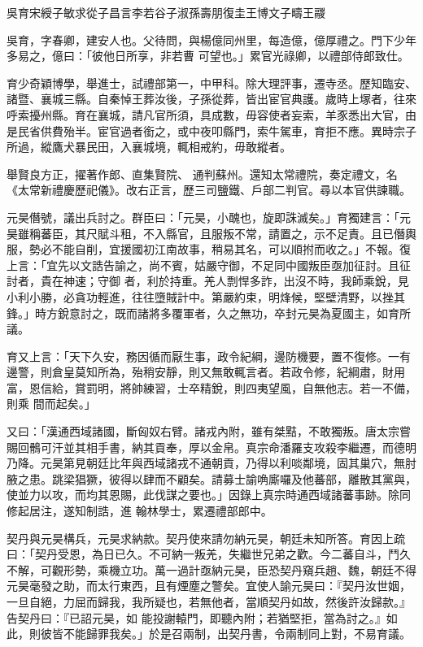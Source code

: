 
\begin{pinyinscope}

 吳育宋綬子敏求從子昌言李若谷子淑孫壽朋復圭王博文子疇王鬷



 吳育，字春卿，建安人也。父待問，與楊億同州里，每造億，億厚禮之。門下少年多易之，億曰：「彼他日所享，非若曹
 可望也。」累官光祿卿，以禮部侍郎致仕。



 育少奇穎博學，舉進士，試禮部第一，中甲科。除大理評事，遷寺丞。歷知臨安、諸暨、襄城三縣。自秦悼王葬汝後，子孫從葬，皆出宦官典護。歲時上塚者，往來呼索擾州縣。育在襄城，請凡官所須，具成數，毋容使者妄索，羊豕悉出大官，由是民省供費殆半。宦官過者銜之，或中夜叩縣門，索牛駕車，育拒不應。異時宗子所過，縱鷹犬暴民田，入襄城境，輒相戒約，毋敢縱者。



 舉賢良方正，擢著作郎、直集賢院、
 通判蘇州。還知太常禮院，奏定禮文，名《太常新禮慶歷祀儀》。改右正言，歷三司鹽鐵、戶部二判官。尋以本官供諫職。



 元昊僭號，議出兵討之。群臣曰：「元昊，小醜也，旋即誅滅矣。」育獨建言：「元昊雖稱蕃臣，其尺賦斗租，不入縣官，且服叛不常，請置之，示不足責。且已僭輿服，勢必不能自削，宜援國初江南故事，稍易其名，可以順拊而收之。」不報。復上言：「宜先以文誥告諭之，尚不賓，姑嚴守御，不足同中國叛臣亟加征討。且征討者，貴在神速；守御
 者，利於持重。羌人剽悍多詐，出沒不時，我師乘銳，見小利小勝，必貪功輕進，往往墮賊計中。第嚴約束，明烽候，堅壁清野，以挫其鋒。」時方銳意討之，既而諸將多覆軍者，久之無功，卒封元昊為夏國主，如育所議。



 育又上言：「天下久安，務因循而厭生事，政令紀綱，邊防機要，置不復修。一有邊警，則倉皇莫知所為，殆稍安靜，則又無敢輒言者。若政令修，紀綱肅，財用富，恩信給，賞罰明，將帥練習，士卒精銳，則四夷望風，自無他志。若一不備，則乘
 間而起矣。」



 又曰：「漢通西域諸國，斷匈奴右臂。諸戎內附，雖有桀黠，不敢獨叛。唐太宗嘗賜回鶻可汗並其相手書，納其貢奉，厚以金帛。真宗命潘羅支攻殺李繼遷，而德明乃降。元昊第見朝廷比年與西域諸戎不通朝貢，乃得以利啖鄰境，固其巢穴，無肘腋之患。跳梁猖獗，彼得以肆而不顧矣。請募士諭唃廝囉及他蕃部，離散其黨與，使並力以攻，而均其恩賜，此伐謀之要也。」因錄上真宗時通西域諸蕃事跡。除同修起居注，遂知制誥，進
 翰林學士，累遷禮部郎中。



 契丹與元昊構兵，元昊求納款。契丹使來請勿納元昊，朝廷未知所答。育因上疏曰：「契丹受恩，為日已久。不可納一叛羌，失繼世兄弟之歡。今二蕃自斗，鬥久不解，可觀形勢，乘機立功。萬一過計亟納元昊，臣恐契丹窺兵趙、魏，朝廷不得元昊毫發之助，而太行東西，且有煙塵之警矣。宜使人諭元昊曰：『契丹汝世姻，一旦自絕，力屈而歸我，我所疑也，若無他者，當順契丹如故，然後許汝歸款。』告契丹曰：『已詔元昊，如
 能投謝轅門，即聽內附；若猶堅拒，當為討之。』如此，則彼皆不能歸罪我矣。」於是召兩制，出契丹書，令兩制同上對，不易育議。




\end{pinyinscope}
